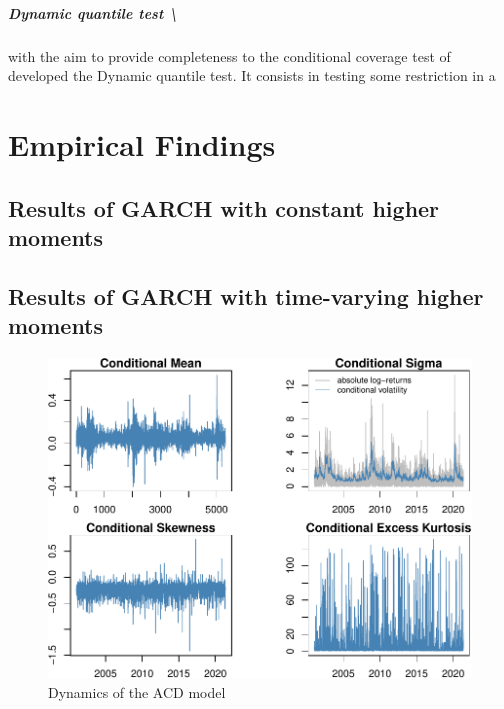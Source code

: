 \documentclass[a4paper, twoside]{templates/ociamthesis}
\begin{document}
\hypertarget{dynamic-quantile-test}{%
\paragraph{Dynamic quantile test \textbackslash{}}\label{dynamic-quantile-test}}

\textcite{engle2004} with the aim to provide completeness to the conditional coverage test of \textcite{christoffersen2001} developed the Dynamic quantile test. It consists in testing some restriction in a

\clearpage

\hypertarget{analysis}{%
\chapter{Empirical Findings}\label{analysis}}

\minitoc 

\hypertarget{results-of-garch-with-constant-higher-moments}{%
\section{Results of GARCH with constant higher moments}\label{results-of-garch-with-constant-higher-moments}}

\hypertarget{results-of-garch-with-time-varying-higher-moments}{%
\section{Results of GARCH with time-varying higher moments}\label{results-of-garch-with-time-varying-higher-moments}}

\begin{figure}

{\centering \includegraphics{_main_files/figure-latex/figureACDmoments-1} 

}

\caption{Dynamics of the ACD model}\label{fig:figureACDmoments}
\end{figure}
\end{document}
